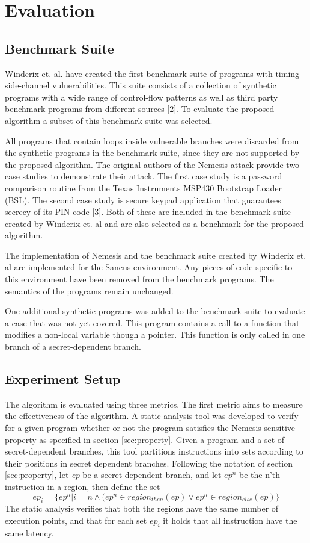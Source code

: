 
\chapter{Evaluation}
\section{Benchmark Suite}
Winderix et. al. have created the first benchmark suite of programs with timing side-channel vulnerabilities. This suite consists of a 
collection of synthetic programs with a wide range of control-flow patterns as well as third party benchmark programs from different sources [2]. 
To evaluate the proposed algorithm a subset of this benchmark suite was selected. 

All programs that contain loops inside vulnerable branches were discarded from the synthetic programs in the benchmark suite, 
since they are not supported by the proposed algorithm. 
The original authors of the Nemesis attack provide two case studies to demonstrate their attack. 
The first case study is a password comparison routine from the Texas Instruments MSP430 Bootstrap Loader (BSL). 
The second case study is secure keypad application that guarantees secrecy of its PIN code [3].
Both of these are included in the benchmark suite created by Winderix et. al and are also selected as a benchmark for the proposed algorithm. 

The implementation of Nemesis and the benchmark suite created by Winderix et. al are implemented for the Sancus environment. Any pieces of code specific to this
environment have been removed from the benchmark programs. The semantics of the programs remain unchanged. 

One additional synthetic programs was added to the benchmark suite to evaluate a case that was not yet covered. This program contains a call to a function that 
modifies a non-local variable though a pointer. This function is only called in one branch of a secret-dependent branch. 

\section{Experiment Setup}
The algorithm is evaluated using three metrics. The first metric aims to measure the effectiveness of the algorithm. A static analysis tool was developed to verify 
for a given program whether or not the program satisfies the Nemesis-sensitive property as specified in section \ref{sec:property}.
Given a program and a set of secret-dependent branches, this tool partitions instructions into sets according to their positions in secret dependent branches. Following the notation of section \ref{sec:property}, let \textit{ep} be a secret dependent branch, and let $ep^n$ be the n'th instruction in a region, then define the set 
\begin{equation} \label{eq:toolSets}
    ep_i = \{ ep^n |i = n \land  (ep^n \in region_{then}(ep) \lor ep^n \in region_{else}(ep)\}
\end{equation}
The static analysis verifies that both the regions have the same number of execution points, and that for each set $ep_i$ it holds that all 
instruction have the same latency.

